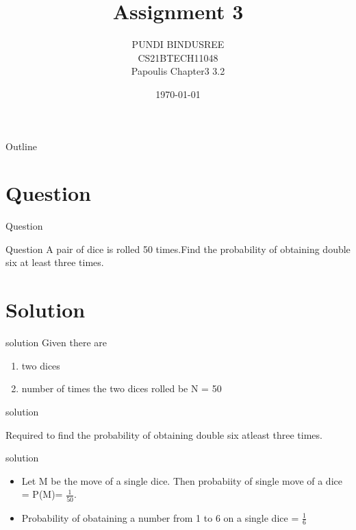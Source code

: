 \documentclass{beamer}
\title{Assignment 3}
\author{PUNDI BINDUSREE \\
     CS21BTECH11048 \\
     Papoulis Chapter3 3.2\\ }
\date{\today}
\begin{document}
     
\begin{frame}
    \maketitle    
\end{frame}
     
     \logo{}
     
     \begin{frame}{Outline}
    \tableofcontents
     \end{frame}

   \section{Question}
   \begin{frame}{Question}
   \begin{block}{Question}
   A pair of dice is rolled 50 times.Find the probability of obtaining double six at least three times.
   \end{block}
   \end{frame}
   
   \section{Solution}
   \begin{frame}{solution}
    Given there are
     \begin{enumerate}
          \item two dices
          \item number of times the two dices rolled be N = 50
       \end{enumerate}
   \end{frame}
   
   \begin{frame}{solution}
   
        \begin{block}{Required to find}
       the probability of obtaining double six atleast three times.
       \end{block}

   \end{frame}
   
   \begin{frame}{solution}
   \begin{itemize}
       \item Let M be the move of a single dice.
   Then probabiity of single move of a dice = P(M)= $\frac{1}{50}$.
       \item Probability of obataining a number from 1 to 6 on a single dice  = $\frac{1}{6}$
       \end{itemize}
    \end{frame}
    
\end{document}
